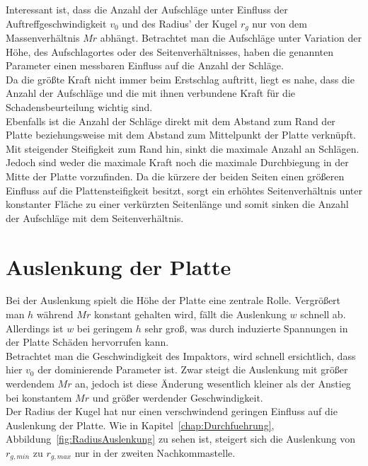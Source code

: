 Interessant ist, dass die Anzahl der Aufschläge unter Einfluss der Auftreffgeschwindigkeit $v_{0}$ und des Radius' der Kugel $r_{g}$ nur von dem Massenverhältnis $Mr$ abhängt. Betrachtet man die Aufschläge unter Variation der Höhe, des Aufschlagortes oder des Seitenverhältnisses, haben die genannten Parameter einen messbaren Einfluss auf die Anzahl der Schläge. \\
Da die größte Kraft nicht immer beim Erstschlag auftritt, liegt es nahe, dass die Anzahl der Aufschläge und die mit ihnen verbundene Kraft für die Schadensbeurteilung wichtig sind.\\
Ebenfalls ist die Anzahl der Schläge direkt mit dem Abstand zum Rand der Platte beziehungsweise mit dem Abstand zum Mittelpunkt der Platte verknüpft. Mit steigender Steifigkeit zum Rand hin, sinkt die maximale Anzahl an Schlägen. Jedoch sind weder die maximale Kraft noch die maximale Durchbiegung in der Mitte der Platte vorzufinden. Da die kürzere der beiden Seiten einen größeren Einfluss auf die Plattensteifigkeit besitzt, sorgt ein erhöhtes Seitenverhältnis unter konstanter Fläche zu einer verkürzten Seitenlänge und somit sinken die Anzahl der Aufschläge mit dem Seitenverhältnis.

\section{Auslenkung der Platte}
\label{sec:Auslenkung}

Bei der Auslenkung spielt die Höhe der Platte eine zentrale Rolle. Vergrößert man $h$ während $Mr$ konstant gehalten wird, fällt die Auslenkung $w$ schnell ab. Allerdings ist $w$ bei geringem $h$ sehr groß, was durch induzierte Spannungen in der Platte Schäden hervorrufen kann.\\
Betrachtet man die Geschwindigkeit des Impaktors, wird schnell ersichtlich, dass hier $v_{0}$ der dominierende Parameter ist. Zwar steigt die Auslenkung mit größer werdendem $Mr$ an, jedoch ist diese Änderung wesentlich kleiner als der Anstieg bei konstantem $Mr$ und größer werdender Geschwindigkeit.\\
Der Radius der Kugel hat nur einen verschwindend geringen Einfluss auf die Auslenkung der Platte. Wie in Kapitel~\ref{chap:Durchfuehrung}, Abbildung~\ref{fig:RadiusAuslenkung} zu sehen ist, steigert sich die Auslenkung von $r_{g,min}$ zu $r_{g,max}$ nur in der zweiten Nachkommastelle. \\


